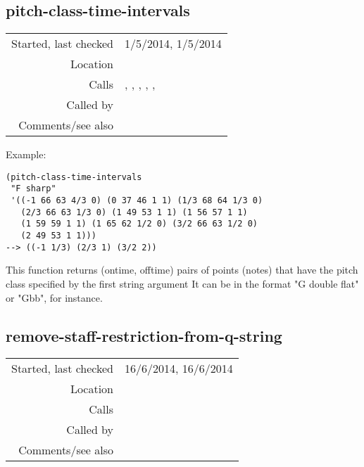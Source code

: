 \subsection*{pitch-class-time-intervals}\label{fun:pitch-class-time-intervals}

\vspace{0.3cm}
\begin{tabular}{r|p{8cm}}
Started, last checked & 1/5/2014, 1/5/2014 \\
Location & \nameref{sec:pitches-intervals-durations} \\
Calls & \nameref{fun:dataset-restricted-to-m-in-nth}, \nameref{fun:modify-question-by-staff-restriction}, \nameref{fun:my-last-string}, \nameref{fun:pitch-and-octave2MIDI-morphetic-pair}, \nameref{fun:replace-all}, \nameref{fun:restrict-dataset-in-nth-to-xs} \\
Called by & \nameref{fun:Stravinsqi-Jun2014} \\
Comments/see also &
\end{tabular}

\vspace{0.5cm}
\noindent Example:
\begin{verbatim}
(pitch-class-time-intervals
 "F sharp"
 '((-1 66 63 4/3 0) (0 37 46 1 1) (1/3 68 64 1/3 0)
   (2/3 66 63 1/3 0) (1 49 53 1 1) (1 56 57 1 1)
   (1 59 59 1 1) (1 65 62 1/2 0) (3/2 66 63 1/2 0)
   (2 49 53 1 1)))
--> ((-1 1/3) (2/3 1) (3/2 2))
\end{verbatim}

\noindent This function returns (ontime, offtime)
pairs of points (notes) that have the pitch class
specified by the first string argument It can be in
the format "G double flat" or "Gbb", for
instance.


\subsection*{remove-staff-restriction-from-q-string}\label{fun:remove-staff-restriction-from-q-string}

\vspace{0.3cm}
\begin{tabular}{r|p{8cm}}
Started, last checked & 16/6/2014, 16/6/2014 \\
Location & \nameref{sec:pitches-intervals-durations} \\
Calls & \nameref{fun:replace-all} \\
Called by & \nameref{fun:modify-question-by-staff-restriction} \\
Comments/see also & \nameref{fun:word-and-event-time-intervals}
\end{tabular}

